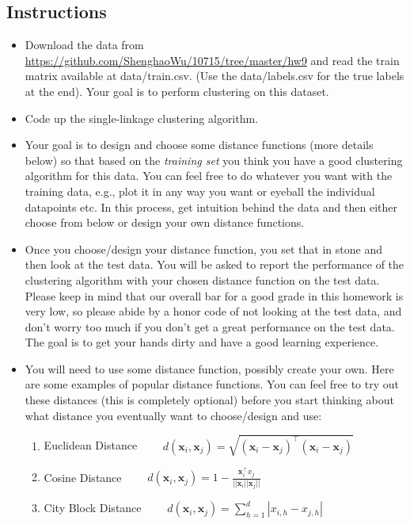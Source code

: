 \documentclass{article}
\begin{document}
\subsection{Instructions}
\begin{itemize}

\item Download the data from \url{https://github.com/ShenghaoWu/10715/tree/master/hw9} and read the train matrix available at data/train.csv. (Use the data/labels.csv for the true labels at the end). Your goal is to perform clustering on this dataset.

\item Code up the single-linkage clustering algorithm.

\item Your goal is to design and choose some distance functions (more details below) so that based on the \emph{training set} you think you have a good clustering algorithm for this data. You can feel free to do whatever you want with the training data, e.g., plot it in any way you want or eyeball the individual datapoints etc. In this process, get intuition behind the data and then either choose from below or design your own distance functions.

\item Once you choose/design your distance function, you set that in stone and then look at the test data. You will be asked to report the performance of the clustering algorithm with your chosen distance function on the test data. Please keep in mind that our overall bar for a good grade in this homework is very low, so please abide by a honor code of not looking at the test data, and don't worry too much if you don't get a great performance on the test data. The goal is to get your hands dirty and have a good learning experience. 

\item You will need to use some distance function, possibly create your own. Here are some examples of popular distance functions. You can feel free to try out these distances (this is completely optional) before you start thinking about what distance you eventually want to choose/design and use:
\begin{enumerate}
    \item Euclidean Distance $\qquad d(\mathbf{x}_{i}, \mathbf{x}_{j}) = \sqrt{(\mathbf{x}_{i}-\mathbf{x}_{j})^{\intercal}(\mathbf{x}_{i}-\mathbf{x}_{j})}$
    \item Cosine Distance $\qquad d(\mathbf{x}_{i}, \mathbf{x}_{j}) = 1-\frac{\mathbf{x}_{i}^{\intercal}x_{j}}{||\mathbf{x}_{i}||\mathbf{x}_{j}||}$
    \item City Block Distance $\qquad d(\mathbf{x}_{i}, \mathbf{x}_{j})=\sum^{d}_{h=1}|x_{i,h}-x_{j,h}|$
\end{enumerate}


\end{itemize}
\end{document}
